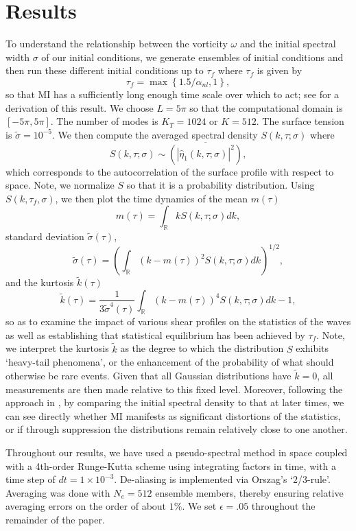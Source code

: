 \documentclass[a4paper,11pt]{article}
\begin{document}
\section{Results}
To understand the relationship between the vorticity $\omega$ and the initial spectral width $\sigma$ of our initial conditions, we generate ensembles of initial conditions and then run these different initial conditions up to $\tau_{f}$ where $\tau_{f}$ is given by
\[
\tau_{f}=\max\left\{1.5/\alpha_{nl},1\right\},
\]
so that MI has a sufficiently long enough time scale over which to act; see \cite{curtis8} for a derivation of this result.  We choose $L=5\pi$ so that the computational domain is $[-5\pi,5\pi]$.  The number of modes is $K_{T} = 1024$ or $K=512$.  The surface tension is $\tilde{\sigma} = 10^{-5}$. We then compute the averaged spectral density $S(k,\tau;\sigma)$ where 
\[
S\left(k,\tau;\sigma\right) \sim \overline{\left( \left|\hat{\eta}_{1}\left(k,\tau;\sigma \right)\right|^{2}\right)},
\]
which corresponds to the autocorrelation of the surface profile with respect to space.  Note, we normalize $S$ so that it is a probability distribution.  Using $S(k,\tau_{f},\sigma)$, we then plot the time dynamics of the mean $m(\tau)$
\[
m(\tau) = \int_{\mathbb{R}} k S\left(k,\tau;\sigma\right) dk,
\]
standard deviation $\tilde{\sigma}(\tau)$,
\[
\tilde{\sigma}(\tau) = \left(\int_{\mathbb{R}} (k-m(\tau))^{2} S\left(k,\tau;\sigma\right) dk\right)^{1/2},
\]
and the kurtosis $\tilde{k}(\tau)$
\[
\tilde{k}(\tau) = \frac{1}{3\tilde{\sigma}^{4}(\tau)}\int_{\mathbb{R}} (k-m(\tau))^{4} S\left(k,\tau;\sigma\right) dk - 1,
\]
so as to examine the impact of various shear profiles on the statistics of the waves as well as establishing that statistical equilibrium has been achieved by $\tau_{f}$.  Note, we interpret the kurtosis $\tilde{k}$ as the degree to which the distribution $S$ exhibits `heavy-tail phenomena', or the enhancement of the probability of what should otherwise be rare events.  Given that all Gaussian distributions have $\tilde{k}=0$, all measurements are then made relative to this fixed level.  Moreover, following the approach in \cite{dysthe2,dysthe3}, by comparing the initial spectral density to that at later times, we can see directly whether MI manifests as significant distortions of the statistics, or if through suppression the distributions remain relatively close to one another.  

Throughout our results, we have used a pseudo-spectral method in space coupled with a 4th-order Runge-Kutta scheme using integrating factors in time, with a time step of $dt = 1 \times 10^{-3}$.  De-aliasing is implemented via Orszag's `2/3-rule'.  Averaging was done with $N_{e}=512$ ensemble members, thereby ensuring relative averaging errors on the order of about $1\%$.  We set $\epsilon=.05$ throughout the remainder of the paper.  
\end{document}
